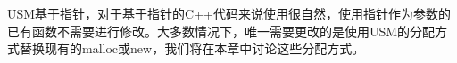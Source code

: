 USM基于指针，对于基于指针的C++代码来说使用很自然，使用指针作为参数的已有函数不需要进行修改。大多数情况下，唯一需要更改的是使用USM的分配方式替换现有的malloc或new，我们将在本章中讨论这些分配方式。\par













































